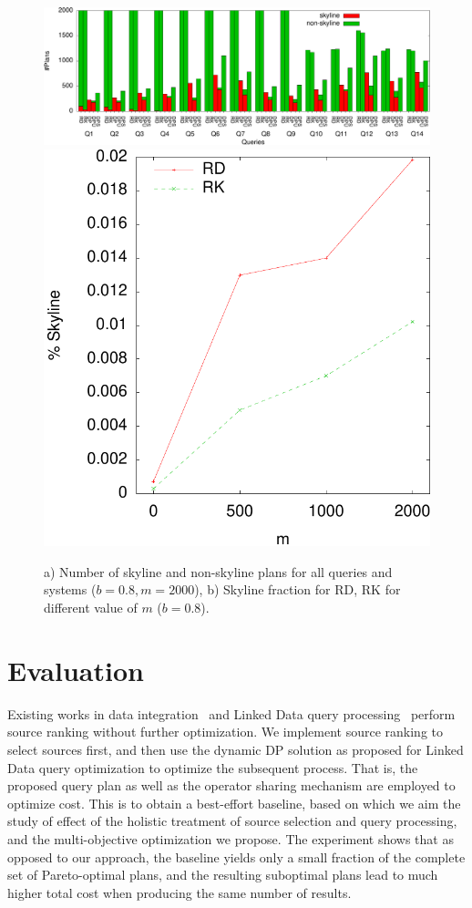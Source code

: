 \begin{figure}[htb]
  \vspace{-0.6cm}
  \centering
  \includegraphics[width=0.75\linewidth]{figs/all_queries-crop.pdf}
  \includegraphics[width=0.24\linewidth]{figs/plans_skyline_by_m-crop.pdf}
  \caption{a) Number of skyline and non-skyline plans for all queries
    and systems ($b=0.8, m=2000$), b) Skyline fraction for RD, RK for
    different value of $m$ ($b=0.8$).}
  \label{fig:queries}
  \vspace{-0.5cm}
\end{figure}

\section{Evaluation}
\label{sec:eva}
Existing works in data integration~\cite{levy_querying_1996} and Linked Data query processing~\cite{harth_data_2010,ladwig_linked_2010} perform source ranking
without further optimization. We implement source ranking to select sources first, and then use the dynamic DP solution as proposed for Linked Data query optimization to optimize
the subsequent process. That is, the proposed query plan as well as
the operator sharing mechanism are employed to optimize cost. This is
to obtain a best-effort baseline, based on which we aim the study of
effect of the holistic treatment of source selection and query
processing, and the multi-objective optimization we propose. The
experiment shows that as opposed to our approach, the baseline yields
only a small fraction of the complete set of Pareto-optimal plans, and
the resulting suboptimal plans lead to much higher total cost when producing
the same number of results. 


